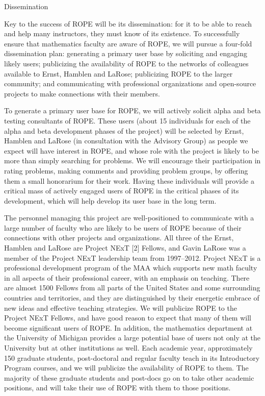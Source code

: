 \documentclass[11pt]{article}
\begin{document}
\begin{section}{Dissemination}

Key to the success of ROPE will be its dissemination: for it to be able
to reach and help many instructors, they must know of its existence.  To
successfully ensure that mathematics faculty are aware of ROPE, we will
pursue a four-fold dissemination plan: generating a primary user base by
soliciting and engaging likely users; publicizing the availability of ROPE to the networks of colleagues available to Ernst, Hamblen and
LaRose; publicizing ROPE to the larger community; and communicating
with professional organizations and open-source projects to make
connections with their members.

To generate a primary user base for ROPE, we will actively solicit
alpha and beta testing consultants of ROPE.  These users (about 15
individuals for each of the alpha and beta development phases of the
project) will be selected by Ernst, Hamblen and LaRose (in consultation
with the Advisory Group) as people we expect will have interest in ROPE, and whose role with the project is likely to be more than simply
searching for problems.  We will encourage their participation in rating
problems, making comments and providing problem groups, by offering them a
small honorarium for their work.  Having these individuals will provide a
critical mass of actively engaged users of ROPE in the critical phases
of its development, which will help develop its user base in the long
term.

The personnel managing this project are well-positioned to communicate
with a large number of faculty who are likely to be users of ROPE
because of their connections with other projects and organizations.  All
three of the Ernst, Hamblen and LaRose are Project NExT [2]
Fellows, and Gavin LaRose was a member of the Project NExT leadership team
from 1997--2012.
Project NExT is a professional development program of the MAA which
supports new math faculty in all aspects of their professional career,
with an emphasis on teaching.  There are almost 1500 Fellows from all parts
of the United States and some surrounding countries and territories, and
they are distinguished by their energetic embrace of new ideas and
effective teaching strategies.  We will publicize ROPE to the Project
NExT Fellows, and have good reason to expect that many of them will become
significant users of ROPE.  In addition, the mathematics department at
the University of Michigan provides a large potential base of users not
only at the University but at other institutions as well.  Each academic
year, approximately 150 graduate students, post-doctoral and regular
faculty teach in its Introductory Program courses, and we will publicize
the availability of ROPE to them.  The majority of these graduate
students and post-docs go on to take other academic positions, and will
take their use of ROPE with them to those positions.


\end{section}
\end{document}
